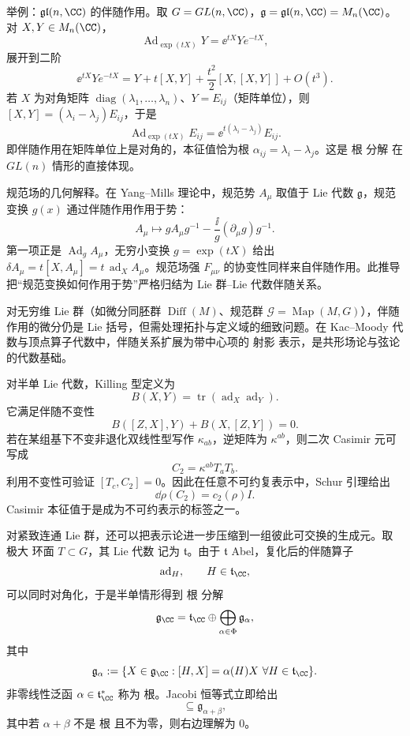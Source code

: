 举例：$\mathfrak{gl}(n,\CC)$ 的伴随作用。取 $G=GL(n,\CC)$，$\mathfrak g=\mathfrak{gl}(n,\CC)=M_n(\CC)$。对 $X,Y\in M_n(\CC)$，
\[
\operatorname{Ad}_{\exp(tX)}Y=\ee^{tX}Ye^{-tX},
\]
展开到二阶
\[
\ee^{tX}Ye^{-tX}=Y+t[X,Y]+\frac{t^2}{2}[X,[X,Y]]+O(t^3).
\]
若 $X$ 为对角矩阵 $\operatorname{diag}(\lambda_1,\ldots,\lambda_n)$、$Y=E_{ij}$（矩阵单位），则 $[X,Y]=(\lambda_i-\lambda_j)E_{ij}$，于是
\[
\operatorname{Ad}_{\exp(tX)}E_{ij}=\ee^{t(\lambda_i-\lambda_j)}E_{ij}.
\]
即伴随作用在矩阵单位上是对角的，本征值恰为根 $\alpha_{ij}=\lambda_i-\lambda_j$。这是 根 分解 在 $GL(n)$ 情形的直接体现。

规范场的几何解释。在 Yang--Mills 理论中，规范势 $A_\mu$ 取值于 Lie 代数 $\mathfrak g$，规范变换 $g(x)$ 通过伴随作用作用于势：
\[
A_\mu\mapsto gA_\mu g^{-1}-\frac{\ii}{g}(\partial_\mu g)g^{-1}.
\]
第一项正是 $\operatorname{Ad}_g A_\mu$，无穷小变换 $g=\exp(tX)$ 给出 $\delta A_\mu=t[X,A_\mu]=t\,\operatorname{ad}_X A_\mu$。规范场强 $F_{\mu\nu}$ 的协变性同样来自伴随作用。此推导把“规范变换如何作用于势”严格归结为 Lie 群--Lie 代数伴随关系。

对无穷维 Lie 群（如微分同胚群 $\operatorname{Diff}(M)$、规范群 $\mathcal G=\operatorname{Map}(M,G)$），伴随作用的微分仍是 Lie 括号，但需处理拓扑与定义域的细致问题。在 Kac--Moody 代数与顶点算子代数中，伴随关系扩展为带中心项的 射影 表示，是共形场论与弦论的代数基础。

对半单 Lie 代数，Killing 型定义为
\[
B(X,Y)=\operatorname{tr}(\operatorname{ad}_X\operatorname{ad}_Y).
\]
它满足伴随不变性
\[
B([Z,X],Y)+B(X,[Z,Y])=0.
\]
若在某组基下不变非退化双线性型写作 $\kappa_{ab}$，逆矩阵为 $\kappa^{ab}$，则二次 Casimir 元可写成
\begin{equation*}C_2=\kappa^{ab}T_aT_b.\end{equation*}
利用不变性可验证 $[T_c,C_2]=0$。因此在任意不可约复表示中，Schur 引理给出
\[
\dd\rho(C_2)=c_2(\rho)I.
\]
Casimir 本征值于是成为不可约表示的标签之一。

对紧致连通 Lie 群，还可以把表示论进一步压缩到一组彼此可交换的生成元。取 极大 环面 $T\subset G$，其 Lie 代数 记为 $\mathfrak t$。由于 $\mathfrak t$ Abel，复化后的伴随算子
\[
\operatorname{ad}_H,
\qquad H\in\mathfrak t_\CC,
\]
可以同时对角化，于是半单情形得到 根 分解
\begin{equation*}{
\mathfrak g_\CC
=\mathfrak t_\CC
\oplus
\bigoplus_{\alpha\in\Phi}\mathfrak g_\alpha,
}\end{equation*}
其中
\begin{equation*}\mathfrak g_\alpha
:=\{X\in\mathfrak g_\CC:[H,X]=\alpha(H)X
\ \forall H\in\mathfrak t_\CC\}.\end{equation*}
非零线性泛函 $\alpha\in\mathfrak t_\CC^*$ 称为 根。Jacobi 恒等式立即给出
\begin{equation*}[\mathfrak g_\alpha,\mathfrak g_\beta]
\subseteq\mathfrak g_{\alpha+\beta},\end{equation*}
其中若 $\alpha+\beta$ 不是 根 且不为零，则右边理解为 $0$。

